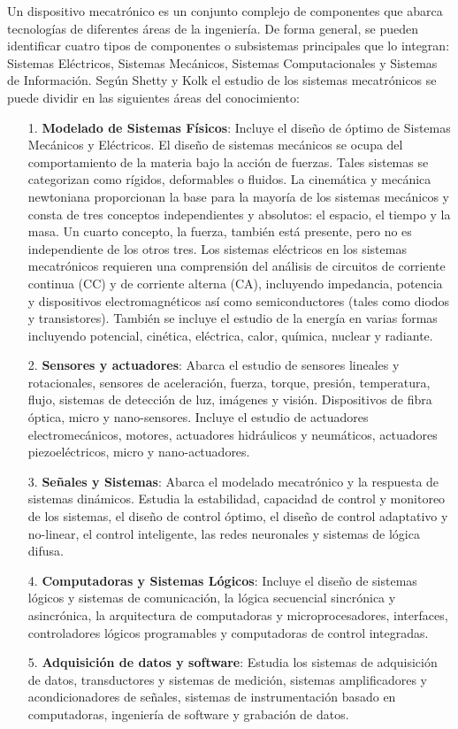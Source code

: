 Un dispositivo mecatrónico es un conjunto complejo de componentes que abarca tecnologías de diferentes áreas de la ingeniería. De forma general, se pueden identificar cuatro tipos de componentes o subsistemas principales que lo integran: Sistemas Eléctricos, Sistemas Mecánicos, Sistemas Computacionales y Sistemas de Información.  Según  Shetty y Kolk \cite{shetty_mechatronics_2010} el estudio de los sistemas mecatrónicos se puede dividir en las siguientes áreas del conocimiento:
	\\
	\begin{itemize}
	\item[1.]\textbf{Modelado de Sistemas Físicos}: Incluye el diseño de óptimo de Sistemas Mecánicos y Eléctricos. El diseño de sistemas mecánicos se ocupa del comportamiento de la materia bajo la acción de fuerzas. Tales sistemas se categorizan como rígidos, deformables o fluidos. La cinemática y mecánica newtoniana proporcionan la base para la mayoría de los sistemas mecánicos y consta de tres conceptos independientes y absolutos: el espacio, el tiempo y la masa. Un cuarto concepto, la fuerza, también está presente, pero no es independiente de los otros tres. Los sistemas eléctricos en los sistemas mecatrónicos requieren una comprensión del análisis de circuitos de corriente continua (CC) y de corriente alterna (CA), incluyendo impedancia, potencia y dispositivos electromagnéticos así como semiconductores (tales como diodos y transistores). También se incluye el estudio de la energía en varias formas incluyendo potencial, cinética, eléctrica, calor, química, nuclear y radiante.
	\item[2.]\textbf{Sensores y actuadores}: Abarca el estudio de sensores lineales y rotacionales, sensores de aceleración, fuerza, torque, presión, temperatura, flujo, sistemas de detección de luz, imágenes y visión. Dispositivos de fibra óptica, micro y nano-sensores. Incluye el estudio de actuadores electromecánicos, motores, actuadores hidráulicos y neumáticos, actuadores piezoeléctricos, micro y nano-actuadores.
	\item[3.]\textbf{Señales y Sistemas}: Abarca el modelado mecatrónico y la respuesta de sistemas dinámicos. Estudia la estabilidad, capacidad de control y monitoreo de los sistemas, el diseño de control óptimo, el diseño de control adaptativo y no-linear, el control inteligente, las redes neuronales y sistemas de lógica difusa.
	\item[4.]\textbf{Computadoras y Sistemas Lógicos}: Incluye el diseño de sistemas lógicos y sistemas de comunicación, la lógica secuencial sincrónica y asincrónica, la arquitectura de computadoras y microprocesadores, interfaces, controladores lógicos programables y computadoras de control integradas.
	\item[5.]\textbf{Adquisición de datos y software}: Estudia los sistemas de adquisición de datos, transductores y sistemas de medición, sistemas amplificadores y acondicionadores de señales, sistemas de instrumentación basado en computadoras, ingeniería de software y grabación de datos.
	
\end{itemize}

